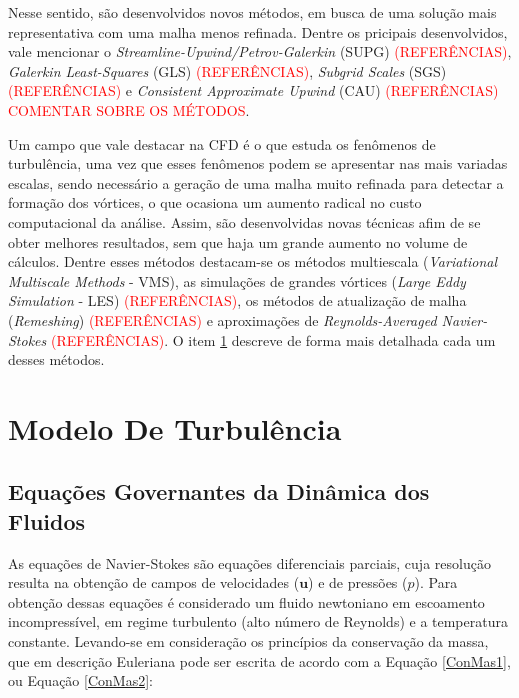 \documentclass[_ArquivoPrincipal.tex]{subfiles}
\begin{document}
Nesse sentido, são desenvolvidos novos métodos, em busca de uma solução mais representativa com uma malha menos refinada. Dentre os pricipais desenvolvidos, vale mencionar o \textit{Streamline-Upwind/Petrov-Galerkin} (SUPG) \textcolor{red}{(REFERÊNCIAS)}, \textit{Galerkin Least-Squares} (GLS) \textcolor{red}{(REFERÊNCIAS)}, \textit{Subgrid Scales} (SGS) \textcolor{red}{(REFERÊNCIAS)} e \textit{Consistent Approximate Upwind} (CAU) \textcolor{red}{(REFERÊNCIAS)} \textcolor{red}{COMENTAR SOBRE OS MÉTODOS}.

Um campo que vale destacar na CFD é o que estuda os fenômenos de turbulência, uma vez que esses fenômenos podem se apresentar nas mais variadas escalas, sendo necessário a geração de uma malha muito refinada para detectar a formação dos vórtices, o que ocasiona um aumento radical no custo computacional da análise. Assim, são desenvolvidas novas técnicas afim de se obter melhores resultados, sem que haja um grande aumento no volume de cálculos. Dentre esses métodos destacam-se os métodos multiescala (\textit{Variational Multiscale Methods} - VMS), as simulações de grandes vórtices (\textit{Large Eddy Simulation} - LES) \textcolor{red}{(REFERÊNCIAS)}, os métodos de atualização de malha (\textit{Remeshing}) \textcolor{red}{(REFERÊNCIAS)} e aproximações de \textit{Reynolds-Averaged Navier-Stokes} \textcolor{red}{(REFERÊNCIAS)}. O item \ref{MT} descreve de forma mais detalhada cada um desses métodos.

\section{Modelo De Turbulência} \label{MT}

\subsection{Equações Governantes da Dinâmica dos Fluidos} \label{EqGov}

As equações de Navier-Stokes são equações diferenciais parciais, cuja resolução resulta na obtenção de campos de velocidades ($\mathbf{u}$) e de pressões ($p$). Para obtenção dessas equações é considerado um fluido newtoniano em escoamento incompressível, em regime turbulento (alto número de Reynolds) e a temperatura constante. Levando-se em consideração os princípios da conservação da massa, que em descrição Euleriana pode ser escrita de acordo com a Equação \ref{ConMas1}, ou Equação \ref{ConMas2}:
\end{document}

